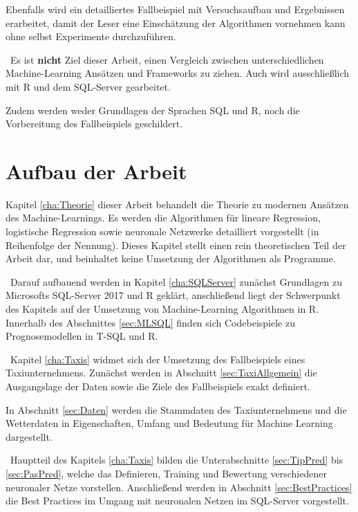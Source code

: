 Ebenfalls wird ein detailliertes Fallbeispiel mit Versuchsaufbau und Ergebnissen erarbeitet, damit der Leser eine Einschätzung der Algorithmen vornehmen kann ohne selbst Experimente durchzuführen.

~\newline Es ist \textbf{nicht} Ziel dieser Arbeit, einen Vergleich zwischen unterschiedlichen Machine-Learning Ansätzen und Frameworks zu ziehen. Auch wird ausschließlich mit R und dem SQL-Server gearbeitet. 

Zudem werden weder Grundlagen der Sprachen SQL und R, noch die Vorbereitung des Fallbeispiels geschildert.

\section{Aufbau der Arbeit}
Kapitel \ref{cha:Theorie} dieser Arbeit behandelt die Theorie zu modernen Ansätzen des Machine-Learnings. Es werden die Algorithmen für lineare Regression, logistische Regression sowie neuronale Netzwerke detailliert vorgestellt (in Reihenfolge der Nennung). Dieses Kapitel stellt einen rein theoretischen Teil der Arbeit dar, und beinhaltet keine Umsetzung der Algorithmen als Programme.

~\newline Darauf aufbauend  werden in Kapitel \ref{cha:SQLServer} zunächst Grundlagen zu Microsofts SQL-Server 2017 und R geklärt, anschließend liegt der Schwerpunkt des Kapitels auf der Umsetzung von Machine-Learning Algorithmen in R. Innerhalb des Abschnittes \ref{sec:MLSQL} finden sich Codebeispiele zu Prognosemodellen in T-SQL und R.

~\newline Kapitel \ref{cha:Taxis} widmet sich der Umsetzung des Fallbeispiels eines Taxiunternehmens. Zunächst werden in Abschnitt \ref{sec:TaxiAllgemein} die Ausgangslage der Daten sowie die Ziele des Fallbeispiels exakt definiert. 

In Abschnitt \ref{sec:Daten} werden die Stammdaten des Taxiunternehmens und die Wetterdaten in Eigenschaften, Umfang und Bedeutung für Machine Learning dargestellt. 

~\newline Hauptteil des Kapitels \ref{cha:Taxis} bilden die Unterabschnitte \ref{sec:TipPred} bis \ref{sec:PasPred}, welche das Definieren, Training und Bewertung verschiedener neuronaler Netze vorstellen. Anschließend werden in Abschnitt \ref{sec:BestPractices} die Best Practices im Umgang mit neuronalen Netzen im SQL-Server vorgestellt.

